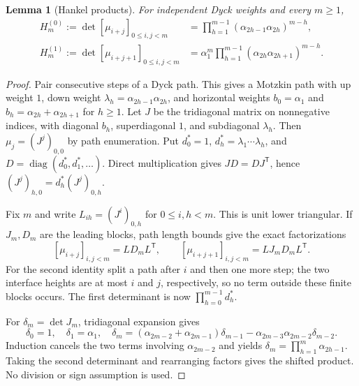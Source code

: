 \documentclass[11pt]{article}
\newtheorem{lemma}[theorem]{Lemma}
\theoremstyle{definition}
\theoremstyle{remark}
\newcommand{\diag}{\operatorname{diag}}
\newcommand{\transpose}{\mathsf T}
\begin{document}
\begin{lemma}[Hankel products]\label{lem:hankel}
For independent Dyck weights and every $m\ge1$,
\begin{align*}
 H_m^{(0)}:=\det[\mu_{i+j}]_{0\le i,j<m}
 &=\prod_{h=1}^{m-1}(\alpha_{2h-1}\alpha_{2h})^{m-h},\\
 H_m^{(1)}:=\det[\mu_{i+j+1}]_{0\le i,j<m}
 &=\alpha_1^m\prod_{h=1}^{m-1}(\alpha_{2h}\alpha_{2h+1})^{m-h}.
\end{align*}
\end{lemma}
\begin{proof}
Pair consecutive steps of a Dyck path. This gives a Motzkin path with
up weight $1$, down weight $\lambda_h=\alpha_{2h-1}\alpha_{2h}$,
and horizontal weights $b_0=\alpha_1$ and
$b_h=\alpha_{2h}+\alpha_{2h+1}$ for $h\ge1$.
Let $J$ be the tridiagonal matrix on nonnegative indices, with diagonal
$b_h$, superdiagonal $1$, and subdiagonal $\lambda_h$.
Then $\mu_j=(J^j)_{0,0}$ by path enumeration.
Put $d_0^*=1$, $d_h^*=\lambda_1\cdots\lambda_h$, and
$D=\diag(d_0^*,d_1^*,\ldots)$. Direct multiplication gives
$JD=DJ^\transpose$, hence
$(J^j)_{h,0}=d_h^*(J^j)_{0,h}$.

Fix $m$ and write $L_{ih}=(J^i)_{0,h}$ for $0\le i,h<m$.
This is unit lower triangular. If $J_m,D_m$ are the leading blocks, path
length bounds give the exact factorizations
\[
 [\mu_{i+j}]_{i,j<m}=LD_mL^\transpose,\qquad
 [\mu_{i+j+1}]_{i,j<m}=LJ_mD_mL^\transpose.
\]
For the second identity split a path after $i$ and then one more step;
the two interface heights are at most $i$ and $j$, respectively, so no
term outside these finite blocks occurs. The first determinant is now
$\prod_{h=0}^{m-1}d_h^*$.

For $\delta_m=\det J_m$, tridiagonal expansion gives
\[
 \delta_0=1,\quad\delta_1=\alpha_1,\quad
 \delta_m=(\alpha_{2m-2}+\alpha_{2m-1})\delta_{m-1}
          -\alpha_{2m-3}\alpha_{2m-2}\delta_{m-2}.
\]
Induction cancels the two terms involving $\alpha_{2m-2}$ and yields
$\delta_m=\prod_{h=1}^m\alpha_{2h-1}$.
Taking the second determinant and rearranging factors gives the shifted
product. No division or sign assumption is used.
\end{proof}
\end{document}
